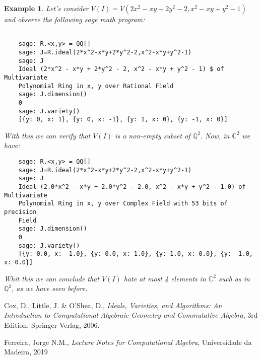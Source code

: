 \documentclass[a4paper,12pt]{article}
\newtheorem{example}[theorem]{Example}
\newcommand{\CC}{\mathbb{C}}
\newcommand{\QQ}{\mathbb{Q}}
\begin{document}
\begin{example}
    Let's consider $ V(I)= V(2x^2-xy+2y^2-2,x^2-xy+y^2-1) $ and observe the following sage math program:
    \begin{verbatim}
        
    sage: R.<x,y> = QQ[]
    sage: J=R.ideal(2*x^2-x*y+2*y^2-2,x^2-x*y+y^2-1)
    sage: J 
    Ideal (2*x^2 - x*y + 2*y^2 - 2, x^2 - x*y + y^2 - 1) $ of Multivariate
    Polynomial Ring in x, y over Rational Field 
    sage: J.dimension() 
    0 
    sage: J.variety() 
    [{y: 0, x: 1}, {y: 0, x: -1}, {y: 1, x: 0}, {y: -1, x: 0}]
    \end{verbatim}
    With this we can verify that $ V(I) $ is a non-empty subset of $ \QQ^2$.
    Now, in $ \CC^2 $ we have:
    \begin{verbatim}
    sage: R.<x,y> = QQ[]
    sage: J=R.ideal(2*x^2-x*y+2*y^2-2,x^2-x*y+y^2-1)
    sage: J
    Ideal (2.0*x^2 - x*y + 2.0*y^2 - 2.0, x^2 - x*y + y^2 - 1.0) of Multivariate 
    Polynomial Ring in x, y over Complex Field with 53 bits of precision
    Field
    sage: J.dimension()
    0
    sage: J.variety()
    [{y: 0.0, x: -1.0}, {y: 0.0, x: 1.0}, {y: 1.0, x: 0.0}, {y: -1.0, x: 0.0}]
    \end{verbatim}
    Whit this we can conclude that $ V(I) $ hate at most 4 elements in $ \CC^2 $ such as in $ \QQ^2 $, as we have seen before.
\end{example}
\begin{thebibliography}{1}
 Cox, D., Little, J. \& O'Shea, D.,  \emph{Ideals, Varieties, and Algorithms: An Introduction to Computational Algebraic Geometry and  Commutative Algebra}, 3rd Edition, Springer-Verlag,  2006. 
	
Ferreira, Jorge N.M., \emph{Lecture Notes for Computational Algebra}, Universidade da Madeira, 2019
\end{thebibliography}
\end{document}
